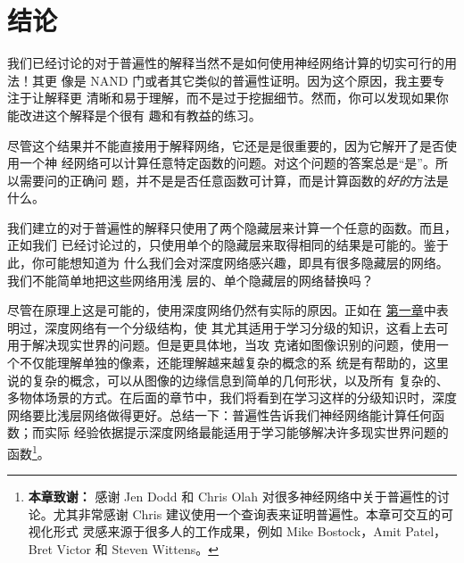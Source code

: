 \section{结论}
\label{sec:conclusion}

我们已经讨论的对于普遍性的解释当然不是如何使用神经网络计算的切实可行的用法！其更
像是 {\serif NAND} 门或者其它类似的普遍性证明。因为这个原因，我主要专注于让解释更
清晰和易于理解，而不是过于挖掘细节。然而，你可以发现如果你能改进这个解释是个很有
趣和有教益的练习。

尽管这个结果并不能直接用于解释网络，它还是是很重要的，因为它解开了是否使用一个神
经网络可以计算任意特定函数的问题。对这个问题的答案总是“是”。所以需要问的正确问
题，并不是是否任意函数可计算，而是计算函数的\emph{好的}方法是什么。

我们建立的对于普遍性的解释只使用了两个隐藏层来计算一个任意的函数。而且，正如我们
已经讨论过的，只使用单个的隐藏层来取得相同的结果是可能的。鉴于此，你可能想知道为
什么我们会对深度网络感兴趣，即具有很多隐藏层的网络。我们不能简单地把这些网络用浅
层的、单个隐藏层的网络替换吗？

尽管在原理上这是可能的，使用深度网络仍然有实际的原因。正如在%
\hyperref[sec:toward_deep_learning]{第一章}中表明过，深度网络有一个分级结构，使
其尤其适用于学习分级的知识，这看上去可用于解决现实世界的问题。但是更具体地，当攻
克诸如图像识别的问题，使用一个不仅能理解单独的像素，还能理解越来越复杂的概念的系
统是有帮助的，这里说的复杂的概念，可以从图像的边缘信息到简单的几何形状，以及所有
复杂的、多物体场景的方式。在后面的章节中，我们将看到在学习这样的分级知识时，深度
网络要比浅层网络做得更好。总结一下：普遍性告诉我们神经网络能计算任何函数；而实际
经验依据提示深度网络最能适用于学习能够解决许多现实世界问题的函数\footnote{
  \textbf{本章致谢：} 感谢 Jen Dodd 和 Chris Olah 对很多神经网络中关于普遍性的讨
  论。尤其非常感谢 Chris 建议使用一个查询表来证明普遍性。本章可交互的可视化形式
  灵感来源于很多人的工作成果，例如 Mike Bostock，Amit Patel，Bret Victor 和
  Steven Wittens。}。
